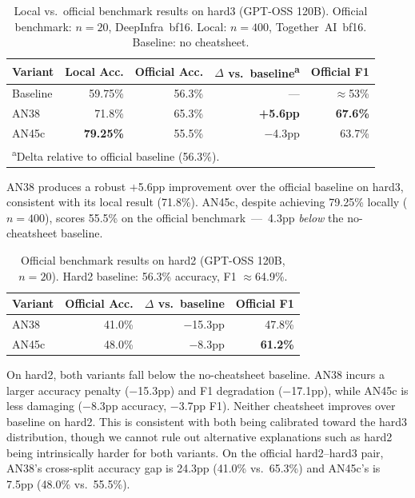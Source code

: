 \documentclass[11pt]{article}
\begin{document}
\begin{table}[h]
\centering
\caption{Local vs.\ official benchmark results on hard3 (GPT-OSS 120B).
Official benchmark: $n=20$, DeepInfra~bf16. Local: $n=400$,
Together~AI~bf16. Baseline: no cheatsheet.}
\label{tab:official_hard3}
\small
\begin{tabular}{lrrrr}
\toprule
Variant & Local Acc. & Official Acc. & $\Delta$ vs.\ baseline\textsuperscript{a} & Official F1 \\
\midrule
Baseline & 59.75\% & 56.3\% & --- & $\approx$53\% \\
AN38     & 71.8\%  & 65.3\% & \textbf{+5.6pp} & \textbf{67.6\%} \\
AN45c    & \textbf{79.25\%} & 55.5\% & $-$4.3pp & 63.7\% \\
\bottomrule
\multicolumn{5}{l}{\textsuperscript{a}Delta relative to official baseline (56.3\%).}
\end{tabular}
\end{table}

AN38 produces a robust $+$5.6pp improvement over the official baseline
on hard3, consistent with its local result (71.8\%). AN45c, despite
achieving 79.25\% locally ($n=400$), scores 55.5\% on the official
benchmark~---~4.3pp \emph{below} the no-cheatsheet baseline.

\begin{table}[h]
\centering
\caption{Official benchmark results on hard2 (GPT-OSS 120B, $n=20$).
Hard2 baseline: 56.3\% accuracy, F1 $\approx$64.9\%.}
\label{tab:official_hard2}
\small
\begin{tabular}{lrrr}
\toprule
Variant & Official Acc. & $\Delta$ vs.\ baseline & Official F1 \\
\midrule
AN38  & 41.0\% & $-$15.3pp & 47.8\% \\
AN45c & 48.0\% & $-$8.3pp  & \textbf{61.2\%} \\
\bottomrule
\end{tabular}
\end{table}

On hard2, both variants fall below the no-cheatsheet baseline. AN38
incurs a larger accuracy penalty ($-$15.3pp) and F1 degradation
($-$17.1pp), while AN45c is less damaging ($-$8.3pp accuracy,
$-$3.7pp F1). Neither cheatsheet improves over baseline on hard2.
This is consistent with both being calibrated toward the hard3
distribution, though we cannot rule out alternative explanations such as
hard2 being intrinsically harder for both variants.
On the official hard2--hard3 pair, AN38's cross-split accuracy gap is
24.3pp (41.0\% vs.\ 65.3\%) and AN45c's is 7.5pp (48.0\% vs.\ 55.5\%).
\end{document}
